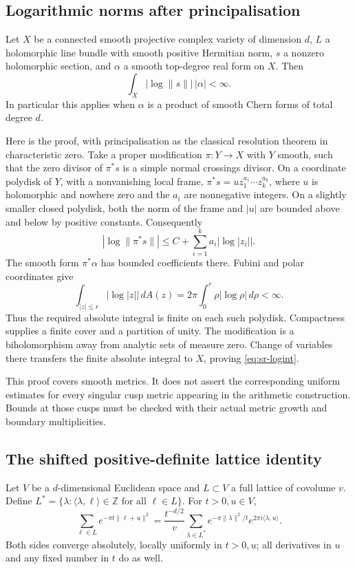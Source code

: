 \subsection{Logarithmic norms after principalisation}
Let \(X\) be a connected smooth projective complex variety of dimension \(d\),
\(L\) a holomorphic line bundle with smooth positive Hermitian norm,
\(s\) a nonzero holomorphic section, and \(\alpha\) a smooth top-degree
real form on \(X\).
Then
\begin{equation}\label{eq:sr-logint}
 \int_X|\log\|s\||\,|\alpha|<\infty.
\end{equation}
In particular this applies when \(\alpha\) is a product of smooth Chern
forms of total degree \(d\).

Here is the proof, with principalisation as the classical resolution
theorem in characteristic zero. Take a proper modification
\(\pi:Y\to X\) with \(Y\) smooth, such that the zero divisor of
\(\pi^*s\) is a simple normal crossings divisor.
On a coordinate polydisk of \(Y\), with a nonvanishing local frame,
\(\pi^*s=u z_1^{a_1}\cdots z_k^{a_k}\), where \(u\) is holomorphic
and nowhere zero and the \(a_i\) are nonnegative integers.
On a slightly smaller closed polydisk, both the norm of the frame
and \(|u|\) are bounded above and below by positive constants.
Consequently
\[
 |\log\|\pi^*s\||\leq C+\sum_{i=1}^ka_i|\log|z_i||.
\]
The smooth form \(\pi^*\alpha\) has bounded coefficients there.
Fubini and polar coordinates give
\[
 \int_{|z|\leq r}|\log|z||\,dA(z)
       =2\pi\int_0^r\rho|\log\rho|\,d\rho<\infty.
\]
Thus the required absolute integral is finite on each such polydisk.
Compactness supplies a finite cover and a partition of unity.
The modification is a biholomorphism away from analytic sets of measure
zero. Change of variables there transfers the finite absolute integral
to \(X\), proving \eqref{eq:sr-logint}.

This proof covers smooth metrics. It does not assert the corresponding
uniform estimates for every singular cusp metric appearing in the
arithmetic construction. Bounds at those cusps must be checked with
their actual metric growth and boundary multiplicities.

\subsection{The shifted positive-definite lattice identity}
Let \(V\) be a \(d\)-dimensional Euclidean space and \(L\subset V\)
a full lattice of covolume \(v\). Define
\(L^*=\{\lambda:\langle\lambda,\ell\rangle\in\mathbb Z
\text{ for all }\ell\in L\}\).
For \(t>0,u\in V\),
\begin{equation}\label{eq:sr-latticetheta}
 \sum_{\ell\in L}e^{-\pi t\|\ell+u\|^2}
 =\frac{t^{-d/2}}v
   \sum_{\lambda\in L^*}
     e^{-\pi\|\lambda\|^2/t}e^{2\pi i\langle\lambda,u\rangle}.
\end{equation}
Both sides converge absolutely, locally uniformly in \(t>0,u\);
all derivatives in \(u\) and any fixed number in \(t\) do as well.

